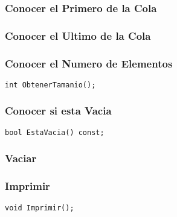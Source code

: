 \documentclass[11pt]{article}
\begin{document}
\subsubsection{Conocer el Primero de la Cola}
\label{sec:orgb677446}
\subsubsection{Conocer el Ultimo de la Cola}
\label{sec:orgfeea550}
\subsubsection{Conocer el Numero de Elementos}
\label{sec:org4d7dfa7}
\begin{verbatim}
int ObtenerTamanio(); 
\end{verbatim}
\subsubsection{Conocer si esta Vacia}
\label{sec:org03bc238}
\begin{verbatim}
bool EstaVacia() const; 
\end{verbatim}
\subsubsection{Vaciar}
\label{sec:org8be6bfd}
\subsubsection{Imprimir}
\label{sec:org78e99c0}
\begin{verbatim}
void Imprimir(); 
\end{verbatim}
\end{document}
